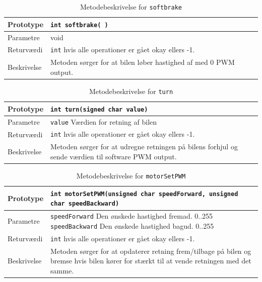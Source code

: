 \begin{table}[H]
	\begin{tabularx}{\textwidth}{| L{2.5 cm} | Z |} \hline
		Prototype & \texttt{int softbrake( )} \\\hline
		Parametre & void
		\\\hline
		Returværdi &  \texttt{int}  hvis alle operationer er gået okay ellers -1. \\\hline
		Beskrivelse & Metoden sørger for at bilen løber hastighed af med 0 PWM output. \\\hline
	\end{tabularx}
	\caption{Metodebeskrivelse for \texttt{softbrake}}
	\label{table:met_softbrake}
\end{table}

\clearpage

\begin{table}[H]
	\begin{tabularx}{\textwidth}{| L{2.5 cm} | Z |} \hline
		Prototype & \texttt{int turn(signed char value)} \\\hline
		Parametre & \texttt{value} \newline
		Værdien for retning af bilen
		\\\hline
		Returværdi &  \texttt{int}  hvis alle operationer er gået okay ellers -1. \\\hline
		Beskrivelse & Metoden sørger for at udregne retningen på bilens forhjul og sende værdien til software PWM output. \\\hline
	\end{tabularx}
	\caption{Metodebeskrivelse for \texttt{turn}}
	\label{table:met_turn}
\end{table}

\begin{table}[H]
	\begin{tabularx}{\textwidth}{| L{2.5 cm} | Z |} \hline
		Prototype & \texttt{int motorSetPWM(unsigned char speedForward, unsigned char speedBackward)} \\\hline
		Parametre & \texttt{speedForward} \newline Den ønskede hastighed fremad. 0..255\newline
		\texttt{speedBackward} \newline Den ønskede hastighed bagud. 0..255
		\\\hline
		Returværdi &  \texttt{int}  hvis alle operationer er gået okay ellers -1. \\\hline
		Beskrivelse & Metoden sørger for at opdaterer retning frem/tilbage på bilen og bremse hvis bilen kører for stærkt til at vende retningen med det samme. \\\hline
	\end{tabularx}
	\caption{Metodebeskrivelse for \texttt{motorSetPWM}}
	\label{table:met_motorSetPWM}
\end{table}

